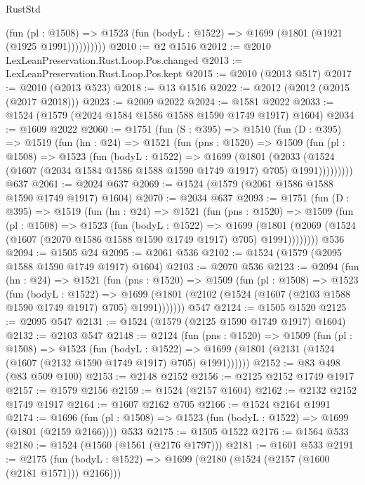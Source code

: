 \begin{lexlean}{RustStd}
\begin{coremodule}
              (fun (pl : @1508) =>
              @1523 (fun (bodyL : @1522) => @1699 (@1801 (@1921 (@1925 @1991))))))))))
@2010 := @2 @1516
@2012 := @2010 LexLeanPreservation.Rust.Loop.Pos.changed
@2013 := LexLeanPreservation.Rust.Loop.Pos.kept
@2015 := @2010 (@2013 @517)
@2017 := @2010 (@2013 @523)
@2018 := @13 @1516
@2022 := @2012 (@2012 (@2015 (@2017 @2018)))
@2023 := @2009 @2022
@2024 := @1581 @2022
@2033 := @1524 (@1579 (@2024 @1584 @1586 @1588 @1590 @1749 @1917) @1604)
@2034 := @1609 @2022
@2060 := @1751
    (fun (S : @395) =>
    @1510
      (fun (D : @395) =>
      @1519
        (fun (hn : @24) =>
        @1521
          (fun (pns : @1520) =>
          @1509
            (fun (pl : @1508) =>
            @1523
              (fun (bodyL : @1522) =>
              @1699
                (@1801
                  (@2033
                    (@1524 (@1607 (@2034 @1584 @1586 @1588 @1590 @1749 @1917) @705) @1991)))))))))
    @637
@2061 := @2024 @637
@2069 := @1524 (@1579 (@2061 @1586 @1588 @1590 @1749 @1917) @1604)
@2070 := @2034 @637
@2093 := @1751
    (fun (D : @395) =>
    @1519
      (fun (hn : @24) =>
      @1521
        (fun (pns : @1520) =>
        @1509
          (fun (pl : @1508) =>
          @1523
            (fun (bodyL : @1522) =>
            @1699
              (@1801 (@2069 (@1524 (@1607 (@2070 @1586 @1588 @1590 @1749 @1917) @705) @1991))))))))
    @536
@2094 := @1505 @24
@2095 := @2061 @536
@2102 := @1524 (@1579 (@2095 @1588 @1590 @1749 @1917) @1604)
@2103 := @2070 @536
@2123 := @2094
    (fun (hn : @24) =>
    @1521
      (fun (pns : @1520) =>
      @1509
        (fun (pl : @1508) =>
        @1523
          (fun (bodyL : @1522) =>
          @1699 (@1801 (@2102 (@1524 (@1607 (@2103 @1588 @1590 @1749 @1917) @705) @1991)))))))
    @547
@2124 := @1505 @1520
@2125 := @2095 @547
@2131 := @1524 (@1579 (@2125 @1590 @1749 @1917) @1604)
@2132 := @2103 @547
@2148 := @2124
    (fun (pns : @1520) =>
    @1509
      (fun (pl : @1508) =>
      @1523
        (fun (bodyL : @1522) =>
        @1699 (@1801 (@2131 (@1524 (@1607 (@2132 @1590 @1749 @1917) @705) @1991))))))
@2152 := @83 @498 (@83 @509 @100)
@2153 := @2148 @2152
@2156 := @2125 @2152 @1749 @1917
@2157 := @1579 @2156
@2159 := @1524 (@2157 @1604)
@2162 := @2132 @2152 @1749 @1917
@2164 := @1607 @2162 @705
@2166 := @1524 @2164 @1991
@2174 := @1696 (fun (pl : @1508) => @1523 (fun (bodyL : @1522) => @1699 (@1801 (@2159 @2166)))) @533
@2175 := @1505 @1522
@2176 := @1564 @533
@2180 := @1524 (@1560 (@1561 (@2176 @1797)))
@2181 := @1601 @533
@2191 := @2175
    (fun (bodyL : @1522) => @1699 (@2180 (@1524 (@2157 (@1600 (@2181 @1571))) @2166)))

\end{coremodule}
\end{lexlean}
